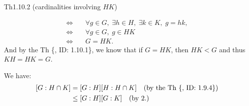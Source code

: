 \documentclass{article}
\begin{document}
\begin{Th}{Th1.10.2 (cardinalities involving $HK$)}
\begin{compactenum}
$$\begin{aligned}
            \Longleftrightarrow \quad & \forall g\in G,\; \exists h\in H,\; \exists k\in K,\; g = hk, \\
            \Longleftrightarrow \quad & \forall g\in G,\; g\in HK \\
            \Longleftrightarrow \quad & G = HK.
        \end{aligned} $$
        And by the Th \{, ID: 1.10.1\}, we know that if $G = HK$, then $HK < G$ and thus $KH = HK = G$.
        \item We have:
        $$ \begin{aligned}\relax %
            [G:H\cap K] &= [G:H][H:H\cap K] \quad (\text{by the Th \{, ID: 1.9.4\}}) \\
            &\leq [G:H][G:K] \quad (\text{by 2.}) 
        \end{aligned} $$
    \end{compactenum}
\end{Th}
\end{document}
